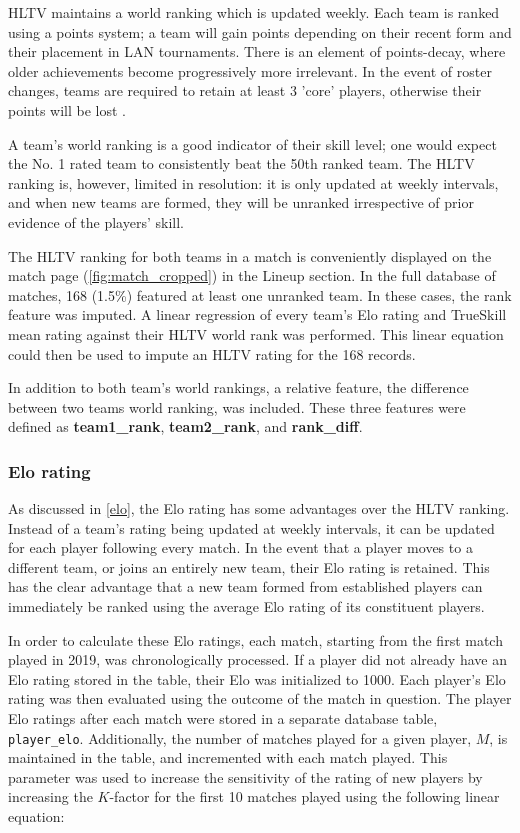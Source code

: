 HLTV maintains a world ranking which is updated weekly. Each team is ranked using a points system; a team will gain points depending on their recent form and their placement in LAN tournaments. There is an element of points-decay, where older achievements become progressively more irrelevant. In the event of roster changes, teams are required to retain at least 3 'core' players, otherwise their points will be lost \cite{hltv-ranking}.

A team's world ranking is a good indicator of their skill level; one would expect the No. 1 rated team to consistently beat the 50th ranked team. The HLTV ranking is, however, limited in resolution: it is only updated at weekly intervals, and when new teams are formed, they will be unranked irrespective of prior evidence of the players' skill. 

The HLTV ranking for both teams in a match is conveniently displayed on the match page (\ref{fig:match_cropped}) in the Lineup section. In the full database of matches, 168 (1.5\%) featured at least one unranked team. In these cases, the rank feature was imputed. A linear regression of every team's Elo rating and TrueSkill mean rating against their HLTV world rank was performed. This linear equation could then be used to impute an HLTV rating for the 168 records.

In addition to both team's world rankings, a relative feature, the difference between two teams world ranking, was included. These three features were defined as \textbf{team1\_rank}, \textbf{team2\_rank}, and \textbf{rank\_diff}. 

\subsubsection{Elo rating}

As discussed in \ref{elo}, the Elo rating has some advantages over the HLTV ranking. Instead of a team's rating being updated at weekly intervals, it can be updated for each player following every match. In the event that a player moves to a different team, or joins an entirely new team, their Elo rating is retained. This has the clear advantage that a new team formed from established players can immediately be ranked using the average Elo rating of its constituent players.

In order to calculate these Elo ratings, each match, starting from the first match played in 2019, was chronologically processed. If a player did not already have an Elo rating stored in the table, their Elo was initialized to 1000. Each player's Elo rating was then evaluated using the outcome of the match in question. The player Elo ratings after each match were stored in a separate database table, \texttt{player\_elo}. Additionally, the number of matches played for a given player, $M$, is maintained in the table, and incremented with each match played. This parameter was used to increase the sensitivity of the rating of new players by increasing the $K$-factor for the first 10 matches played using the following linear equation:

